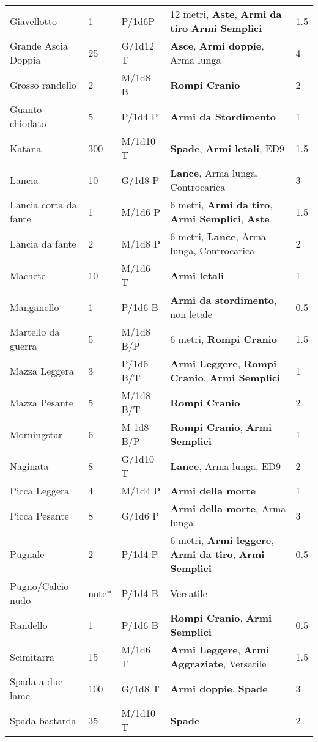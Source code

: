 \documentclass[a4paper,12 pt,openany]{book}
\begin{document}
\begin{textblock*}{19.5cm}
\begin{tabular}{lllll}
Giavellotto& 1& P/1d6P& 12 metri, \textbf{Aste}, \textbf{Armi da tiro} \textbf{Armi Semplici}& 1.5\\
Grande Ascia Doppia& 25 & G/1d12 T& \textbf{Asce}, \textbf{Armi doppie}, Arma lunga& 4\\
Grosso randello& 2& M/1d8 B&\textbf{Rompi Cranio}& 2\\
Guanto chiodato& 5& P/1d4 P&\textbf{Armi da Stordimento}& 1\\
Katana& 300& M/1d10 T& \textbf{Spade}, \textbf{Armi letali}, ED9& 1.5\\
Lancia& 10 & G/1d8 P&\textbf{Lance}, Arma lunga, Controcarica& 3\\
Lancia corta da fante& 1& M/1d6 P& 6 metri, \textbf{Armi da tiro}, \textbf{Armi Semplici}, \textbf{Aste} & 1.5\\
Lancia da fante& 2& M/1d8 P&6 metri, \textbf{Lance}, Arma lunga, Controcarica& 2 \\
Machete& 10 & M/1d6 T&\textbf{Armi letali} & 1\\
Manganello& 1& P/1d6 B& \textbf{Armi da stordimento}, non letale& 0.5\\
Martello da guerra& 5& M/1d8 B/P& 6 metri, \textbf{Rompi Cranio}& 1.5\\
Mazza Leggera& 3& P/1d6 B/T& \textbf{Armi Leggere}, \textbf{Rompi Cranio}, \textbf{Armi Semplici}&1\\
Mazza Pesante& 5& M/1d8 B/T& \textbf{Rompi Cranio}& 2\\
Morningstar& 6& M 1d8 B/P&\textbf{Rompi Cranio},\textbf{ Armi Semplici}& 1\\
Naginata& 8& G/1d10 T&\textbf{Lance}, Arma lunga, ED9& 2\\
Picca Leggera& 4& M/1d4 P&\textbf{Armi della morte}& 1\\
Picca Pesante& 8& G/1d6 P&\textbf{Armi della morte}, Arma lunga& 3\\
Pugnale& 2& P/1d4 P& 6 metri, \textbf{Armi leggere}, \textbf{Armi da tiro}, \textbf{Armi Semplici}& 0.5\\
Pugno/Calcio nudo& note*& P/1d4 B&Versatile& -\\
Randello& 1& P/1d6 B&\textbf{Rompi Cranio}, \textbf{Armi Semplici}& 0.5\\
Scimitarra& 15 & M/1d6 T&\textbf{Armi Leggere}, \textbf{Armi Aggraziate}, Versatile& 1.5\\
Spada a due lame& 100& G/1d8 T& \textbf{Armi doppie}, \textbf{Spade}& 3\\
Spada bastarda& 35 & M/1d10 T&\textbf{Spade}& 2\\

\end{tabular}
\end{textblock*}
\end{document}
